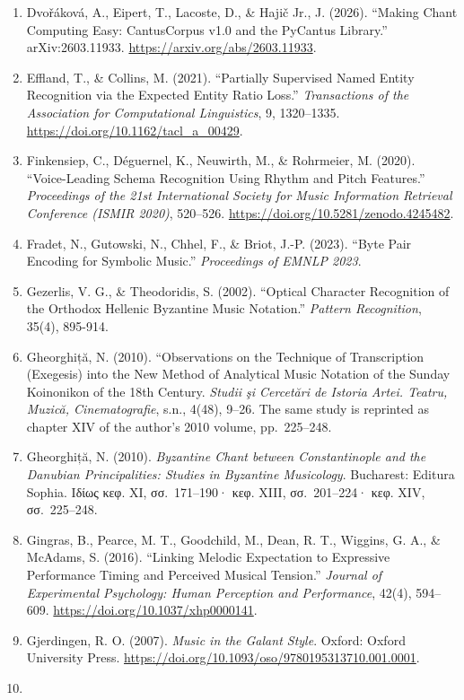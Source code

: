 \documentclass[11pt,a4paper]{article}
\begin{document}
\begin{enumerate}
\item
 Dvořáková, A., Eipert, T., Lacoste, D., \& Hajič Jr., J. (2026). ``Making Chant Computing Easy: CantusCorpus v1.0 and the PyCantus Library.'' arXiv:2603.11933. \url{https://arxiv.org/abs/2603.11933}.
\item
 Effland, T., \& Collins, M. (2021). ``Partially Supervised Named Entity Recognition via the Expected Entity Ratio Loss.'' \emph{Transactions of the Association for Computational Linguistics}, 9, 1320--1335. \url{https://doi.org/10.1162/tacl_a_00429}.
\item
 Finkensiep, C., Déguernel, K., Neuwirth, M., \& Rohrmeier, M. (2020). ``Voice-Leading Schema Recognition Using Rhythm and Pitch Features.'' \emph{Proceedings of the 21st International Society for Music Information Retrieval Conference (ISMIR 2020)}, 520--526. \url{https://doi.org/10.5281/zenodo.4245482}.
\item
 Fradet, N., Gutowski, N., Chhel, F., \& Briot, J.-P. (2023). ``Byte Pair Encoding for Symbolic Music.'' \emph{Proceedings of EMNLP 2023}.
\item
 Gezerlis, V. G., \& Theodoridis, S. (2002). ``Optical Character Recognition of the Orthodox Hellenic Byzantine Music Notation.'' \emph{Pattern Recognition}, 35(4), 895-914.
\item
 Gheorghiță, N. (2010). ``Observations on the Technique of Transcription (Exegesis) into the New Method of Analytical Music Notation of the Sunday Koinonikon of the 18th Century. \emph{Studii şi Cercetări de Istoria Artei. Teatru, Muzică, Cinematografie}, s.n., 4(48), 9--26. The same study is reprinted as chapter XIV of the author's 2010 volume, pp.~225--248.
\item
 Gheorghiță, N. (2010). \emph{Byzantine Chant between Constantinople and the Danubian Principalities: Studies in Byzantine Musicology}. Bucharest: Editura Sophia. Ιδίως κεφ. XI, σσ.~171--190· κεφ. XIII, σσ.~201--224· κεφ. XIV, σσ.~225--248.
\item
 Gingras, B., Pearce, M. T., Goodchild, M., Dean, R. T., Wiggins, G. A., \& McAdams, S. (2016). ``Linking Melodic Expectation to Expressive Performance Timing and Perceived Musical Tension.'' \emph{Journal of Experimental Psychology: Human Perception and Performance}, 42(4), 594--609. \url{https://doi.org/10.1037/xhp0000141}.
\item
 Gjerdingen, R. O. (2007). \emph{Music in the Galant Style}. Oxford: Oxford University Press. \url{https://doi.org/10.1093/oso/9780195313710.001.0001}.
\item

\end{enumerate}
\end{document}
